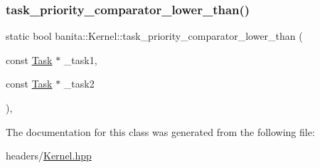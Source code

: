 \subsubsection{\texorpdfstring{task\_priority\_comparator\_lower\_than()}{task\_priority\_comparator\_lower\_than()}}
{\footnotesize\ttfamily static bool banita\+::\+Kernel\+::task\+\_\+priority\+\_\+comparator\+\_\+lower\+\_\+than (\begin{DoxyParamCaption}\item[{const \mbox{\hyperlink{classbanita_1_1_task}{Task}} $\ast$}]{\+\_\+task1,  }\item[{const \mbox{\hyperlink{classbanita_1_1_task}{Task}} $\ast$}]{\+\_\+task2 }\end{DoxyParamCaption})\hspace{0.3cm}{\ttfamily [inline]}, {\ttfamily [static]}}



The documentation for this class was generated from the following file\+:\begin{DoxyCompactItemize}
\item 
headers/\mbox{\hyperlink{_kernel_8hpp}{Kernel.\+hpp}}\end{DoxyCompactItemize}
